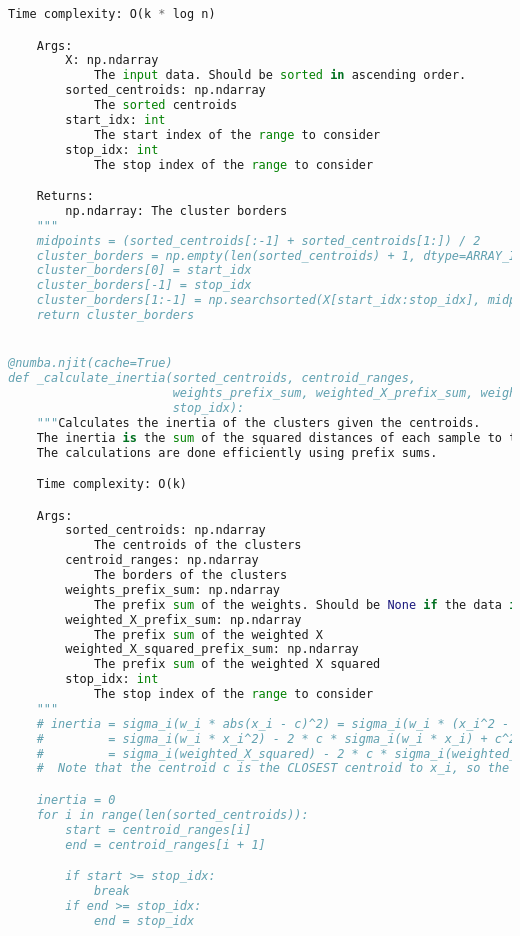 \begin{lstlisting}[language=Python]
    Time complexity: O(k * log n)

    Args:
        X: np.ndarray
            The input data. Should be sorted in ascending order.
        sorted_centroids: np.ndarray
            The sorted centroids
        start_idx: int
            The start index of the range to consider
        stop_idx: int
            The stop index of the range to consider

    Returns:
        np.ndarray: The cluster borders
    """
    midpoints = (sorted_centroids[:-1] + sorted_centroids[1:]) / 2
    cluster_borders = np.empty(len(sorted_centroids) + 1, dtype=ARRAY_INDEX_DTYPE)
    cluster_borders[0] = start_idx
    cluster_borders[-1] = stop_idx
    cluster_borders[1:-1] = np.searchsorted(X[start_idx:stop_idx], midpoints) + start_idx
    return cluster_borders


@numba.njit(cache=True)
def _calculate_inertia(sorted_centroids, centroid_ranges,
                       weights_prefix_sum, weighted_X_prefix_sum, weighted_X_squared_prefix_sum,
                       stop_idx):
    """Calculates the inertia of the clusters given the centroids.
    The inertia is the sum of the squared distances of each sample to the closest centroid.
    The calculations are done efficiently using prefix sums.

    Time complexity: O(k)

    Args:
        sorted_centroids: np.ndarray
            The centroids of the clusters
        centroid_ranges: np.ndarray
            The borders of the clusters
        weights_prefix_sum: np.ndarray
            The prefix sum of the weights. Should be None if the data is unweighted.
        weighted_X_prefix_sum: np.ndarray
            The prefix sum of the weighted X
        weighted_X_squared_prefix_sum: np.ndarray
            The prefix sum of the weighted X squared
        stop_idx: int
            The stop index of the range to consider
    """
    # inertia = sigma_i(w_i * abs(x_i - c)^2) = sigma_i(w_i * (x_i^2 - 2 * x_i * c + c^2))
    #         = sigma_i(w_i * x_i^2) - 2 * c * sigma_i(w_i * x_i) + c^2 * sigma_i(w_i)
    #         = sigma_i(weighted_X_squared) - 2 * c * sigma_i(weighted_X) + c^2 * sigma_i(weight)
    #  Note that the centroid c is the CLOSEST centroid to x_i, so the above calculation must be done for each cluster

    inertia = 0
    for i in range(len(sorted_centroids)):
        start = centroid_ranges[i]
        end = centroid_ranges[i + 1]

        if start >= stop_idx:
            break
        if end >= stop_idx:
            end = stop_idx


\end{lstlisting}
